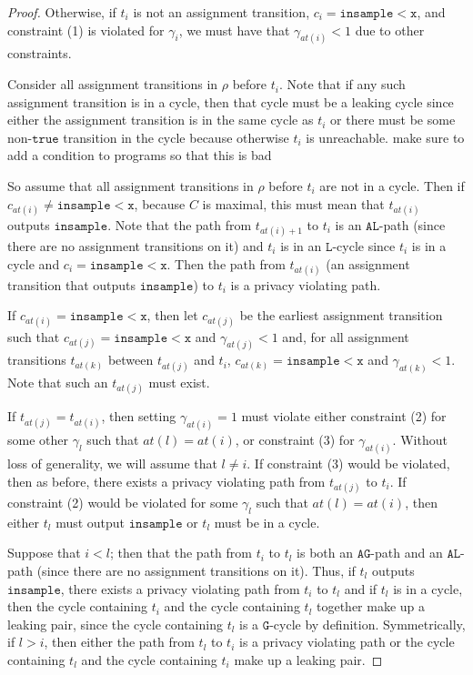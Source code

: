 \documentclass[12pt]{article}
\newcommand{\lguard}[1][x]{\texttt{insample} < #1}
\theoremstyle{definition}
\begin{document}
\begin{proof}
    Otherwise, if $t_i$ is not an assignment transition, $c_i = \lguard[\texttt{x}]$, and constraint (1) is violated for $\gamma_i$, we must have that $\gamma_{at(i)}<1$ due to other constraints.
    
    Consider all assignment transitions in $\rho$ before $t_i$. Note that if any such assignment transition is in a cycle, then that cycle must be a leaking cycle since either the assignment transition is in the same cycle as $t_i$ or there must be some non-$\texttt{true}$ transition in the cycle because otherwise $t_i$ is unreachable. {\color{red} make sure to add a condition to programs so that this is bad}

    So assume that all assignment transitions in $\rho$ before $t_i$ are not in a cycle. Then if $c_{at(i)} \neq \lguard[\texttt{x}]$, because $C$ is maximal, this must mean that $t_{at(i)}$ outputs $\texttt{insample}$. Note that the path from $t_{at(i)+1}$ to $t_i$ is an $\texttt{AL}$-path (since there are no assignment transitions on it) and $t_i$ is in an $\texttt{L}$-cycle since $t_i$ is in a cycle and $c_i = \lguard[\texttt{x}]$. 
    Then the path from $t_{at(i)}$ (an assignment transition that outputs $\texttt{insample}$) to $t_i$ is a privacy violating path. 

    If $c_{at(i)} = \lguard[\texttt{x}]$, then let $c_{at(j)}$ be the earliest assignment transition such that $c_{at(j)} = \lguard[\texttt{x}]$ and $\gamma_{at(j)} < 1$ and, for all assignment transitions $t_{at(k)}$ between $t_{at(j)}$ and $t_i$, $c_{at(k)} = \lguard[\texttt{x}]$ and $\gamma_{at(k)} < 1$. Note that such an $t_{at(j)}$ must exist. 

    If $t_{at(j)} = t_{at(i)}$, then setting $\gamma_{at(i)} =1$ must violate either constraint (2) for some other $\gamma_l$ such that $at(l)=at(i)$, or constraint (3) for $\gamma_{at(i)}$. Without loss of generality, we will assume that $l\neq i$. If constraint (3) would be violated, then as before, there exists a privacy violating path from $t_{at(j)}$ to $t_i$. 
    If constraint (2) would be violated for some $\gamma_l$ such that $at(l)=at(i)$, then either $t_l$ must output $\texttt{insample}$ or $t_l$ must be in a cycle. 
    
    Suppose that $i<l$; then that the path from $t_i$ to $t_l$ is both an $\texttt{AG}$-path and an $\texttt{AL}$-path (since there are no assignment transitions on it). Thus, if $t_l$ outputs $\texttt{insample}$, there exists a privacy violating path from $t_i$ to $t_l$ and if $t_l$ is in a cycle, then the cycle containing $t_i$ and the cycle containing $t_l$ together make up a leaking pair, since the cycle containing $t_l$ is a $\texttt{G}$-cycle by definition. 
    Symmetrically, if $l>i$, then either the path from $t_l$ to $t_i$ is a privacy violating path or the cycle containing $t_l$ and the cycle containing $t_i$ make up a leaking pair.
    

\end{proof}
\end{document}
